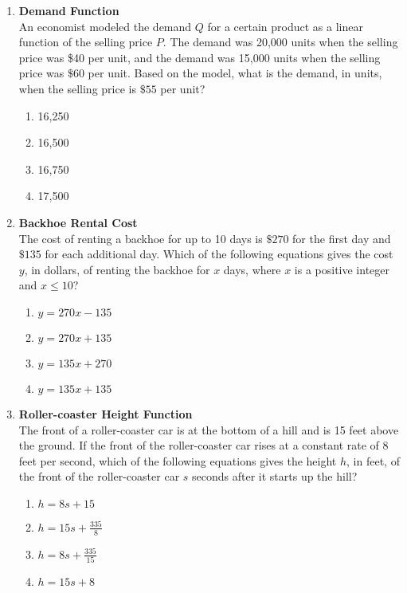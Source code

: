 \begin{enumerate}
\newpage

\item \textbf{Demand Function}\\
An economist modeled the demand $Q$ for a certain product as a linear function of the selling price $P$. The demand was 20,000 units when the selling price was \$40 per unit, and the demand was 15,000 units when the selling price was $\$ 60$ per unit. Based on the model, what is the demand, in units, when the selling price is $\$ 55$ per unit?
\begin{enumerate}[label=(\Alph*)]
  \item 16,250
  \item 16,500
  \item 16,750
  \item 17,500
\end{enumerate}
\begin{subanswer}
\end{subanswer}

\item \textbf{Backhoe Rental Cost}\\
The cost of renting a backhoe for up to 10 days is $\$ 270$ for the first day and $\$ 135$ for each additional day. Which of the following equations gives the cost $y$, in dollars, of renting the backhoe for $x$ days, where $x$ is a positive integer and $x \leq 10$?
\begin{enumerate}[label=(\Alph*)]
  \item $y = 270x - 135$
  \item $y = 270x + 135$
  \item $y = 135x + 270$
  \item $y = 135x + 135$
\end{enumerate}
\begin{subanswer}
\end{subanswer}

\item \textbf{Roller-coaster Height Function}\\
The front of a roller-coaster car is at the bottom of a hill and is 15 feet above the ground. If the front of the roller-coaster car rises at a constant rate of 8 feet per second, which of the following equations gives the height $h$, in feet, of the front of the roller-coaster car $s$ seconds after it starts up the hill?
\begin{enumerate}[label=(\Alph*)]
  \item $h = 8s + 15$
  \item $h = 15s + \frac{335}{8}$
  \item $h = 8s + \frac{335}{15}$
  \item $h = 15s + 8$
\end{enumerate}
\begin{subanswer}
\end{subanswer}


\end{enumerate}
